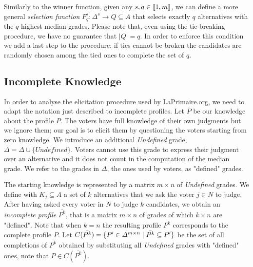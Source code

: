 \documentclass[version=3.21, pagesize, twoside=off, bibliography=totoc, DIV=calc, fontsize=12pt, a4paper]{scrartcl}
\begin{document}
Similarly to the winner function, given any $s,q \in \llbracket1,m\rrbracket$, we can define a more general \emph{selection function} $F^s_q:\Delta^{s} \rightarrow Q \subseteq A$ that selects exactly $q$ alternatives with the $q$ highest median grades. Please note that, even using the tie-breaking procedure, we have no guarantee that $|Q|=q$. In order to enforce this condition we add a last step to the procedure: if ties cannot be broken the candidates are randomly chosen among the tied ones to complete the set of $q$. 

\subsection{Incomplete Knowledge}
In order to analyse the elicitation procedure used by LaPrimaire.org, we need to adapt the notation just described to incomplete profiles. 
 Let $\bar{P}$ be our knowledge about the profile $P$.
The voters have full knowledge of their own judgments but we ignore them; our goal is to elicit them by questioning the voters starting from zero knowledge.
We introduce an additional \emph{Undefined} grade, $\bar{\Delta}=\Delta \cup \{\textit{Undefined}\}$. Voters cannot use this grade to express their judgment over an alternative and it does not count in the computation of the median grade. 
We refer to the grades in $\Delta$, the ones used by voters, as "defined" grades.

The starting knowledge is represented by a matrix $m\times n$ of \textit{Undefined} grades. We define with $K_j \subseteq A$ a set of $k$ alternatives that we ask the voter $j\in N$ to judge. 
After having asked every voter in $N$ to judge $k$ candidates, we obtain an \emph{incomplete profile} $\bar{P^k}$, 
that is a matrix $m \times n$ of grades of which $k \times n$ are "defined". Note that when $k=n$ the resulting profile $\bar{P^k}$ corresponds to the complete profile $P$. Let $C(\bar{P^k}) = \{P' \in \Delta^{m \times n} \suchthat \bar{P^k} \subseteq P'\}$ be the set of all completions of $\bar{P^k}$ obtained by substituting all \emph{Undefined} grades with "defined" ones, note that $P \in C(\bar{P^k})$.
\end{document}
